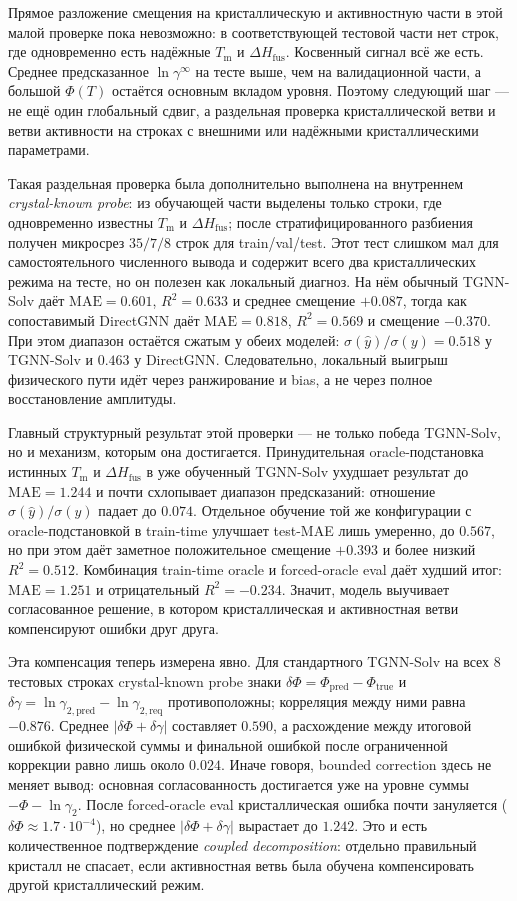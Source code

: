 \documentclass[11pt]{article}
\newcommand{\mae}{\mathrm{MAE}}
\newcommand{\Rtwo}{R^2}
\newcommand{\abs}[1]{\left\lvert #1 \right\rvert}
\newcommand{\Tm}{T_{\mathrm m}}
\newcommand{\dHfus}{\Delta H_{\mathrm{fus}}}
\theoremstyle{definition}
\begin{document}
Прямое разложение смещения на кристаллическую и активностную части в этой малой проверке пока невозможно: в соответствующей тестовой части нет строк, где одновременно есть надёжные $\Tm$ и $\dHfus$. Косвенный сигнал всё же есть. Среднее предсказанное $\ln\gamma^\infty$ на тесте выше, чем на валидационной части, а большой $\Phi(T)$ остаётся основным вкладом уровня. Поэтому следующий шаг --- не ещё один глобальный сдвиг, а раздельная проверка кристаллической ветви и ветви активности на строках с внешними или надёжными кристаллическими параметрами.

Такая раздельная проверка была дополнительно выполнена на внутреннем \emph{crystal-known probe}: из обучающей части выделены только строки, где одновременно известны $\Tm$ и $\dHfus$; после стратифицированного разбиения получен микросрез $35/7/8$ строк для train/val/test. Этот тест слишком мал для самостоятельного численного вывода и содержит всего два кристаллических режима на тесте, но он полезен как локальный диагноз. На нём обычный TGNN-Solv даёт $\mae=0.601$, $\Rtwo=0.633$ и среднее смещение $+0.087$, тогда как сопоставимый DirectGNN даёт $\mae=0.818$, $\Rtwo=0.569$ и смещение $-0.370$. При этом диапазон остаётся сжатым у обеих моделей: $\sigma(\hat y)/\sigma(y)=0.518$ у TGNN-Solv и $0.463$ у DirectGNN. Следовательно, локальный выигрыш физического пути идёт через ранжирование и bias, а не через полное восстановление амплитуды.

Главный структурный результат этой проверки --- не только победа TGNN-Solv, но и механизм, которым она достигается. Принудительная oracle-подстановка истинных $\Tm$ и $\dHfus$ в уже обученный TGNN-Solv ухудшает результат до $\mae=1.244$ и почти схлопывает диапазон предсказаний: отношение $\sigma(\hat y)/\sigma(y)$ падает до $0.074$. Отдельное обучение той же конфигурации с oracle-подстановкой в train-time улучшает test-MAE лишь умеренно, до $0.567$, но при этом даёт заметное положительное смещение $+0.393$ и более низкий $\Rtwo=0.512$. Комбинация train-time oracle и forced-oracle eval даёт худший итог: $\mae=1.251$ и отрицательный $\Rtwo=-0.234$. Значит, модель выучивает согласованное решение, в котором кристаллическая и активностная ветви компенсируют ошибки друг друга.

Эта компенсация теперь измерена явно. Для стандартного TGNN-Solv на всех $8$ тестовых строках crystal-known probe знаки $\delta\Phi=\Phi_{\mathrm{pred}}-\Phi_{\mathrm{true}}$ и $\delta\gamma=\ln\gamma_{2,\mathrm{pred}}-\ln\gamma_{2,\mathrm{req}}$ противоположны; корреляция между ними равна $-0.876$. Среднее $\abs{\delta\Phi+\delta\gamma}$ составляет $0.590$, а расхождение между итоговой ошибкой физической суммы и финальной ошибкой после ограниченной коррекции равно лишь около $0.024$. Иначе говоря, bounded correction здесь не меняет вывод: основная согласованность достигается уже на уровне суммы $-\Phi-\ln\gamma_2$. После forced-oracle eval кристаллическая ошибка почти зануляется ($\delta\Phi\approx1.7\cdot10^{-4}$), но среднее $\abs{\delta\Phi+\delta\gamma}$ вырастает до $1.242$. Это и есть количественное подтверждение \emph{coupled decomposition}: отдельно правильный кристалл не спасает, если активностная ветвь была обучена компенсировать другой кристаллический режим.
\end{document}
